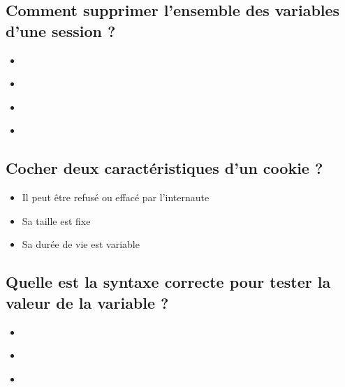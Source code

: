 \documentclass[11pt,a4paper]{article}
\begin{document}
\subsection{Comment supprimer l'ensemble des variables d'une session ?}

\begin{itemize}
\item[\CaseCoche]  \\
\item[\CaseCoche]  \\
\item[\CaseCoche]  \\
\item[\CaseCoche]  \\
\end{itemize}


\subsection{Cocher deux caractéristiques d'un cookie ?}

\begin{itemize}
\item[\CaseCoche] Il peut être refusé ou effacé par l'internaute \\
\item[\CaseCoche] Sa taille est fixe \\
\item[\CaseCoche] Sa durée de vie est variable \\
\end{itemize}


\subsection{Quelle est la syntaxe correcte pour tester la valeur de la variable  ?}

\begin{itemize}
\item[\CaseCoche]  \\
\item[\CaseCoche]  \\
\item[\CaseCoche]  \\
\end{itemize}
\end{document}
